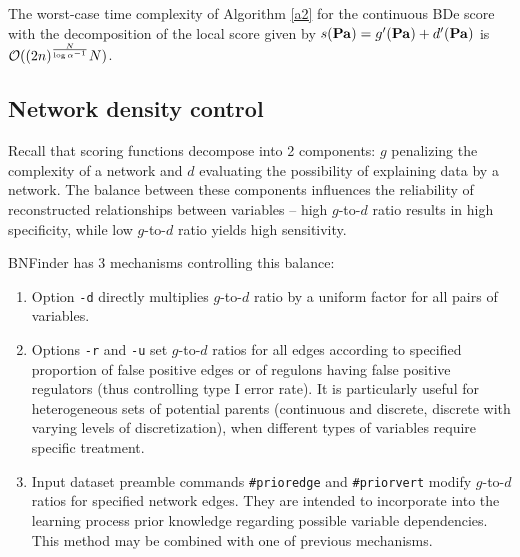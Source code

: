  \begin{theorem}
 The worst-case time complexity of Algorithm \ref{a2} for the continuous BDe score with the decomposition of the local score given by $s(\mathbf{Pa})=g'(\mathbf{Pa})+d'(\mathbf{Pa})$ is $\mathcal{O}((2n)^\frac{N}{\log\alpha^{-1}}N)$.
 \end{theorem}
 
 \subsection{Network density control}

Recall that scoring functions decompose into 2 components: 
$g$ penalizing the complexity of a network and 
$d$ evaluating the possibility of explaining data by a network.
The balance between these components influences 
the reliability of reconstructed relationships between variables --
high $g$-to-$d$ ratio results in high specificity, 
while low $g$-to-$d$ ratio yields high sensitivity.

BNFinder has 3 mechanisms controlling this balance:
\begin{enumerate}
\item Option \verb$-d$ directly multiplies $g$-to-$d$ ratio by 
a uniform factor for all pairs of variables.
\item Options \verb$-r$ and \verb$-u$ set $g$-to-$d$ ratios for all edges
according to specified proportion of false positive edges 
or of regulons having false positive regulators
(thus controlling type I error rate). 
It is particularly useful for heterogeneous sets of potential parents
(continuous and discrete, discrete with varying levels of discretization),
when different types of variables require specific treatment.
\item Input dataset preamble commands \verb$#prioredge$ and \verb$#priorvert$
modify $g$-to-$d$ ratios for specified network edges.
They are intended to incorporate into the learning process 
prior knowledge regarding possible variable dependencies.
This method may be combined with one of previous mechanisms.
\end{enumerate}

